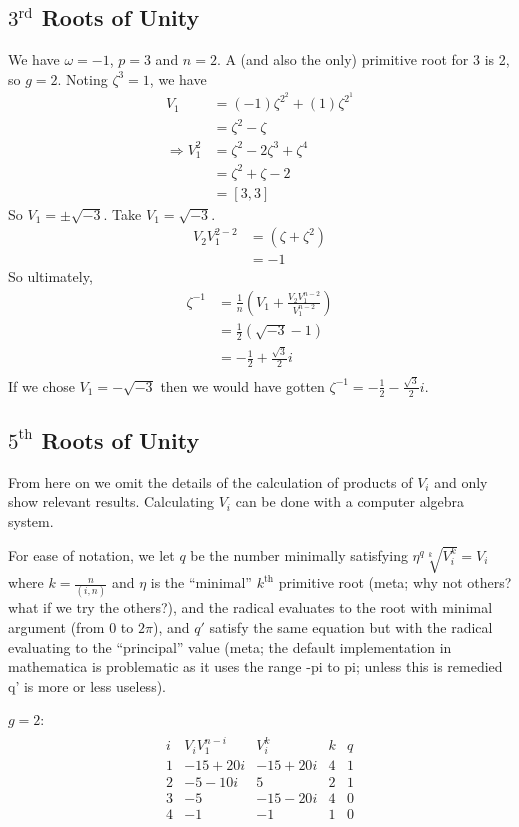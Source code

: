 \documentclass{article}
\renewcommand\({\left(}
\renewcommand\){\right)}
\begin{document}
\subsection{$3^\text{rd}$ Roots of Unity}
We have $\omega=-1$, $p=3$ and $n=2$. A (and also the only) primitive root for 3 is 2, so $g=2$. Noting $\zeta^3=1$, we have
\begin{align*}
    V_1&=(-1)\zeta^{2^2}+(1)\zeta^{2^1}\\
    &=\zeta^2-\zeta\\
    \Rightarrow V_1^2&=\zeta^2-2\zeta^3+\zeta^4\\
    &=\zeta^2+\zeta-2\\
    &=[3,3]
\end{align*}
So $V_1=\pm\sqrt{-3}$. Take $V_1=\sqrt{-3}$. 
\begin{align*}
    V_2V_1^{2-2}&=(\zeta+\zeta^2)\\
    &=-1
\end{align*}
So ultimately,
\begin{align*}
    \zeta^{-1}&=\frac{1}{n}\left(V_1+\frac{V_2V_1^{n-2}}{V_1^{n-2}}\right)\\
    &=\frac{1}{2}\left(\sqrt{-3}-1\right)\\
    &=-\frac{1}{2}+\frac{\sqrt{3}}{2}i\\
\end{align*}
If we chose $V_1=-\sqrt{-3}$ then we would have gotten $\zeta^{-1}=-\frac{1}{2}-\frac{\sqrt{3}}{2}i$.

\newpage
\subsection{$5^\text{th}$ Roots of Unity}
From here on we omit the details of the calculation of products of $V_i$ and only show relevant results. Calculating $V_i$ can be done with a computer algebra system.

For ease of notation, we let $q$ be the number minimally satisfying $\eta^q\sqrt[k]{V_i^k}=V_i$ where $k=\frac{n}{(i,n)}$ and $\eta$ is the ``minimal'' $k^\text{th}$ primitive root (meta; why not others? what if we try the others?), and the radical evaluates to the root with minimal argument (from $0$ to $2\pi$), and $q'$ satisfy the same equation but with the radical evaluating to the ``principal'' value (meta; the default implementation in mathematica is problematic as it uses the range -pi to pi; unless this is remedied q' is more or less useless).

\vspace{6mm}
$g=2$:
\begin{align*}
    \begin{array}{c|c|c|c|c|c}
        i&V_iV_1^{n-i}&V_i^k&k&q\\
        \hline
        1 & -15+20 i & -15+20 i & 4 & 1 \\
        2 & -5-10 i & 5 & 2 & 1 \\
        3 & -5 & -15-20 i & 4 & 0 \\
        4 & -1 & -1 & 1 & 0 \\
    \end{array}
\end{align*}
\end{document}
